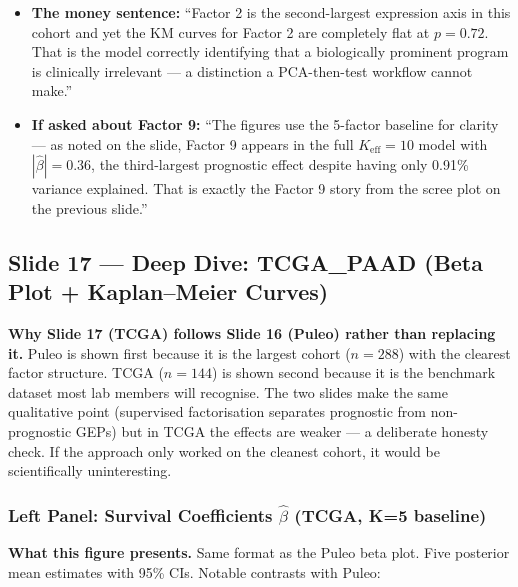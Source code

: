 \documentclass[11pt]{article}
\newcommand{\sectionlabel}[1]{\textbf{#1}}
\begin{document}
\begin{itemize}
  \item \sectionlabel{The money sentence:} ``Factor 2 is the second-largest expression axis in this cohort and yet the KM curves for Factor 2 are completely flat at $p = 0.72$. That is the model correctly identifying that a biologically prominent program is clinically irrelevant --- a distinction a PCA-then-test workflow cannot make.''
  \item \sectionlabel{If asked about Factor 9:} ``The figures use the 5-factor baseline for clarity --- as noted on the slide, Factor 9 appears in the full $K_\text{eff} = 10$ model with $|\hat{\beta}| = 0.36$, the third-largest prognostic effect despite having only 0.91\% variance explained. That is exactly the Factor 9 story from the scree plot on the previous slide.''
\end{itemize}

\subsection*{Slide 17 --- Deep Dive: TCGA\_PAAD (Beta Plot + Kaplan--Meier Curves)}

\noindent\textbf{Why Slide 17 (TCGA) follows Slide 16 (Puleo) rather than replacing it.} Puleo is shown first because it is the largest cohort ($n = 288$) with the clearest factor structure. TCGA ($n = 144$) is shown second because it is the benchmark dataset most lab members will recognise. The two slides make the same qualitative point (supervised factorisation separates prognostic from non-prognostic GEPs) but in TCGA the effects are weaker --- a deliberate honesty check. If the approach only worked on the cleanest cohort, it would be scientifically uninteresting.

\subsubsection*{Left Panel: Survival Coefficients $\hat{\beta}$ (TCGA, K=5 baseline)}

\textbf{What this figure presents.} Same format as the Puleo beta plot. Five posterior mean estimates with 95\% CIs. Notable contrasts with Puleo:
\end{document}
